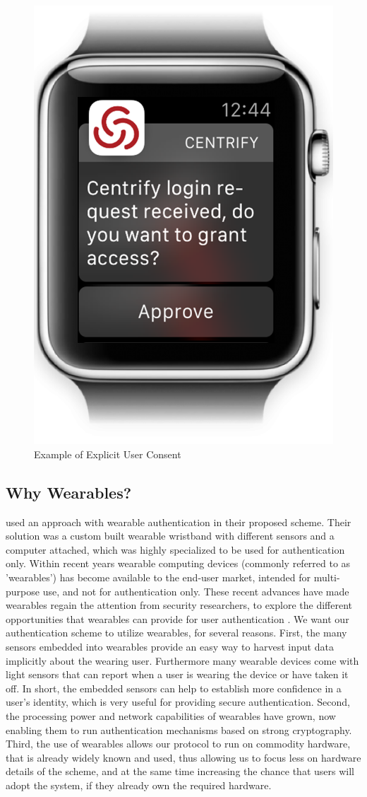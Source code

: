 \begin{figure}[hb]
    \centering
    \includegraphics[width=.35\linewidth]{gfx/consent}
    \caption{Example of Explicit User Consent}
\end{figure}

\subsection{Why Wearables?}
\bigskip

\citet{ojala2008wearable} used an approach with wearable authentication in their proposed scheme. Their solution was a custom built wearable wristband with different sensors and a computer attached, which was highly specialized to be used for authentication only. 
Within recent years wearable computing devices (commonly referred to as 'wearables') has become available to the end-user market, intended for multi-purpose use, and not for authentication only. These recent advances have made wearables regain the attention from security researchers, to explore the different opportunities that wearables can provide for user authentication \cite{bianchi2016wearable}. 
We want our authentication scheme to utilize wearables, for several reasons. First, the many sensors embedded into wearables provide an easy way to harvest input data implicitly about the wearing user. Furthermore many wearable devices come with light sensors that can report when a user is wearing the device or have taken it off. In short, the embedded sensors can help to establish more confidence in a user's identity, which is very useful for providing secure authentication. Second, the processing power and network capabilities of wearables have grown, now enabling them to run authentication mechanisms based on strong cryptography. Third, the use of wearables allows our protocol to run on commodity hardware, that is already widely known and used, thus allowing us to focus less on hardware details of the scheme, and at the same time increasing the chance that users will adopt the system, if they already own the required hardware. 

